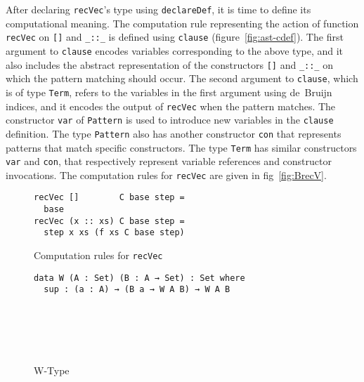 \documentclass[runningheads]{llncs}
\begin{document}
After declaring \texttt{recVec}'s type using {\tt declareDef}, it is time to define its computational meaning.
The computation rule representing the action of function \texttt{recVec} on {\tt []} and {\tt \_::\_} is defined using {\tt clause} (figure~\ref{fig:ast-cdef}). The first argument to {\tt clause} encodes variables corresponding to the above type, and it also includes the abstract representation of the constructors {\tt []} and {\tt \_::\_} on which the pattern matching should occur. The second argument to \texttt{clause}, which is of type {\tt Term}, refers to the variables in the first argument using de~Bruijn indices, and it encodes the output of \texttt{recVec} when the pattern matches.
The constructor {\tt var} of {\tt Pattern} is used to introduce new variables in the {\tt clause} definition. The type {\tt Pattern} also has another constructor {\tt con} that represents patterns that match specific constructors.
The type {\tt Term} has similar constructors {\tt var} and {\tt con}, that respectively represent variable references and constructor invocations.
The computation rules for \texttt{recVec} are given in fig~\ref{fig:BrecV}.


\begin{figure}[t]
\begin{minipage}{.5\textwidth}
\centering
\begingroup
\fontsize{7.9pt}{2pt}\selectfont
\begin{Verbatim}
recVec []        C base step =
  base
recVec (x :: xs) C base step =
  step x xs (f xs C base step)
\end{Verbatim}
\normalsize
\endgroup
\caption{Computation rules for \texttt{recVec}}
\label{fig:BrecV}
\end{minipage}%
\begin{minipage}{.5\textwidth}
\centering
\begingroup
\fontsize{7.9pt}{2pt}\selectfont
\begin{BVerbatim}
data W (A : Set) (B : A → Set) : Set where
  sup : (a : A) → (B a → W A B) → W A B






\end{BVerbatim}
\endgroup
\caption{W-Type}
\label{fig:W-type}
\end{minipage}
\end{figure}
\end{document}
